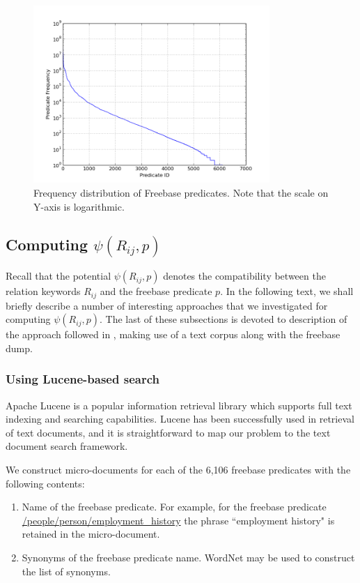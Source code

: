 \documentclass[a4paper, twoside, 12pt]{report}
\begin{document}
\begin{figure}[h!] \label{preddist}
\centering
\includegraphics[width=0.8\textwidth]{./images/pred-freq}
\caption{Frequency distribution of Freebase predicates. Note that the scale on Y-axis is logarithmic.}
\end{figure}

\subsection{Computing $\psi(R_{ij},p)$}
Recall that the potential $\psi(R_{ij},p)$ denotes the compatibility between the relation keywords $R_{ij}$ and the freebase predicate $p$. In the following text, we shall briefly describe a number of interesting approaches that we investigated for computing $\psi(R_{ij}, p)$. The last of these subsections is devoted to description of the approach followed in \cite{joshknowledge}, making use of a text corpus along with the freebase dump.

\subsubsection{Using Lucene-based search}
Apache Lucene \cite{lucene2005high} is a popular information retrieval library which supports full text indexing and searching capabilities. Lucene has been successfully used in retrieval of text documents, and it is straightforward to map our problem to the text document search framework.

We construct micro-documents for each of the 6,106 freebase predicates with the following contents:
\begin{enumerate}
\item Name of the freebase predicate. For example, for the freebase predicate \url{/people/person/employment_history} the phrase ``employment history" is retained in the micro-document.
\item Synonyms of the freebase predicate name. WordNet may be used to construct the list of synonyms.
\end{enumerate}
\end{document}
